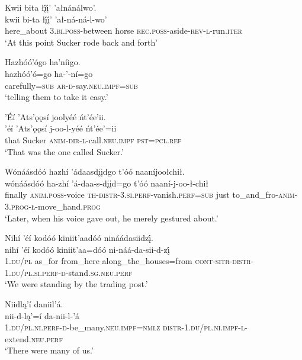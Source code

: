 \ea\label{ex:text1-65-3}
Kwii bita łį́į́’ ’ałnánálwo’.\\
\gll kwii	bi-ta	łį́į́’	’ał-ná-ná-l-wo’\\
     here\_about	3.\textsc{bi}.\textsc{poss}-between	horse	\textsc{rec}.\textsc{poss}-aside-\textsc{rev}-\textsc{l}-run.\textsc{iter}\\
\glt `At this point Sucker rode back and forth'
\z

\ea\label{ex:text1-65-4}
Hazhóó’ógo ha’níigo.\\
\gll hazhóó’ó=go	ha-’-ní=go\\
     carefully=\textsc{sub}	\textsc{ar}-\textsc{d}-say.\textsc{neu}.\textsc{impf}=\textsc{sub}\\
\glt `telling them to take it easy.'
\z

\ea\label{ex:text1-65-5}
’Éí ’Ats’ǫǫsí joolyéé ńt’ée’ii.\\
\gll ’éí	’Ats’ǫǫsí	j-oo-l-yéé	ńt’ée’=ii\\
     that	Sucker	\textsc{anim}-\textsc{dir}-\textsc{l}-call.\textsc{neu}.\textsc{impf}	\textsc{pst}=\textsc{pcl}.\textsc{ref}\\
\glt `That was the one called Sucker.'
\z

\ea\label{ex:text1-65-6}
Wónáásdóó hazhí ’ádaasdįįdgo t’óó naaníjoołchił.\\
\gll wónáásdóó	ha-zhí	’á-daa-s-dįįd=go	t’óó	naaní-j-oo-ł-chił\\
     finally	\textsc{anim}.\textsc{poss}-voice	\textsc{th}-\textsc{distr}-3.\textsc{si}.\textsc{perf}-vanish.\textsc{perf}=\textsc{sub}	just	to\_and\_fro-\textsc{anim}-3.\textsc{prog}-\textsc{ł}-move\_hand.\textsc{prog}\\
\glt `Later, when his voice gave out, he merely gestured about.'
\z

\ea\label{ex:text1-65-7}
Nihí ’éí kodóó kiniit’aadóó nináádasiidzį́.\\
\gll nihí	’éí	kodóó	kiniit’aa=dóó	ni-náá-da-sii-d-zį́\\
     1.\textsc{du}/\textsc{pl}	as\_for	from\_here	along\_the\_houses=from	\textsc{cont}-\textsc{sitr}-\textsc{distr}-1.\textsc{du}/\textsc{pl}.\textsc{si}.\textsc{perf}-\textsc{d}-stand.\textsc{sg}.\textsc{neu}.\textsc{perf}\\
\glt `We were standing by the trading post.'
\z

\ea\label{ex:text1-65-8}
Niidlą’í daniil’á.\\
\gll nii-d-lą’=í	da-nii-l-’á\\
     1.\textsc{du}/\textsc{pl}.\textsc{ni}.\textsc{perf}-\textsc{d}-be\_many.\textsc{neu}.\textsc{impf}=\textsc{nmlz}	\textsc{distr}-1.\textsc{du}/\textsc{pl}.\textsc{ni}.\textsc{impf}-\textsc{l}-extend.\textsc{neu}.\textsc{perf}\\
\glt `There were many of us.'
\z

